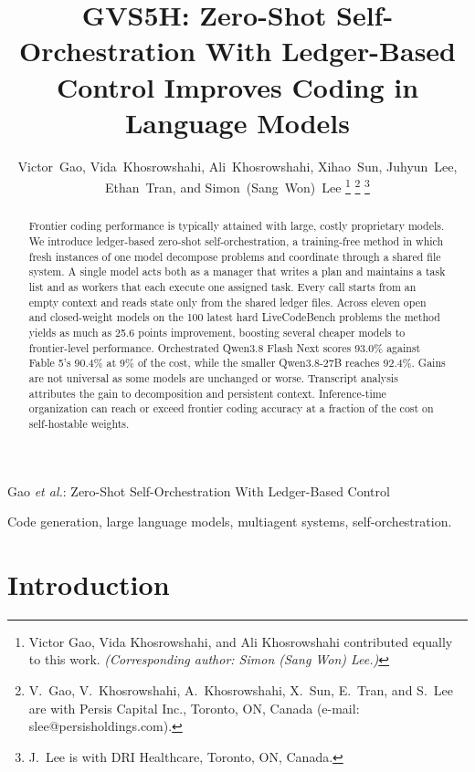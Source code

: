\documentclass[journal]{IEEEtran}
\begin{document}
\title{GVS5H: Zero-Shot Self-Orchestration With Ledger-Based Control Improves Coding in
Language Models}

\author{Victor~Gao, Vida~Khosrowshahi, Ali~Khosrowshahi, Xihao~Sun, Juhyun~Lee,
Ethan~Tran, and Simon~(Sang~Won)~Lee%
\thanks{Victor Gao, Vida Khosrowshahi, and Ali Khosrowshahi contributed equally to this
work. \emph{(Corresponding author: Simon (Sang Won) Lee.)}}%
\thanks{V.~Gao, V.~Khosrowshahi, A.~Khosrowshahi, X.~Sun, E.~Tran, and S.~Lee are with
Persis Capital Inc., Toronto, ON, Canada (e-mail: slee@persisholdings.com).}%
\thanks{J.~Lee is with DRI Healthcare, Toronto, ON, Canada.}}

%
{Gao \MakeLowercase{\textit{et al.}}: Zero-Shot Self-Orchestration With Ledger-Based Control}

\maketitle

\begin{abstract}
Frontier coding performance is typically attained with large, costly proprietary models. We introduce ledger-based zero-shot self-orchestration, a training-free method in which fresh instances of one model decompose problems and coordinate through a shared file system.
A single model acts both as a manager that writes a plan and maintains a task list and as workers that each execute one assigned task. Every call starts from an empty context and reads state only from the shared ledger files.
Across eleven open and closed-weight models on the 100 latest hard LiveCodeBench problems
the method yields as much as 25.6 points improvement, boosting several cheaper models to frontier-level performance.
Orchestrated Qwen3.8 Flash Next scores 93.0\% against Fable 5's 90.4\% at 9\% of the cost, while the smaller Qwen3.8-27B reaches 92.4\%.
Gains are not universal as some models are unchanged or worse. Transcript analysis attributes the gain to decomposition and persistent context.
Inference-time organization can reach or exceed frontier coding accuracy at a fraction of the cost on self-hostable weights.
\end{abstract}

\begin{IEEEkeywords}
Code generation, large language models, multiagent systems, self-orchestration.
\end{IEEEkeywords}

\section{Introduction}
\label{sec:intro}
\end{document}
